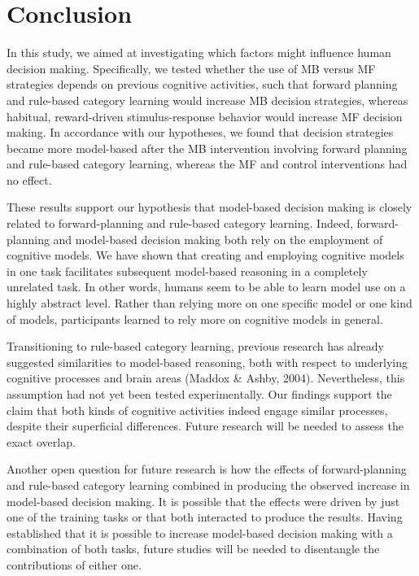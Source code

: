 \documentclass[11pt]{article} %
\begin{document}
\section{Conclusion}
In this study, we aimed at investigating which factors might influence human decision making. Specifically, we tested whether the use of MB versus MF strategies depends on previous cognitive activities, such that forward planning and rule-based category learning would increase MB decision strategies, whereas habitual, reward-driven stimulus-response behavior would increase MF decision making. In accordance with our hypotheses, we found that decision strategies became more model-based after the MB intervention involving forward planning and rule-based category learning, whereas the MF and control interventions had no effect.


These results support our hypothesis that model-based decision making is closely related to forward-planning and rule-based category learning. Indeed, forward-planning and model-based decision making both rely on the employment of cognitive models. We have shown that creating and employing cognitive models in one task facilitates subsequent model-based reasoning in a completely unrelated task. In other words, humans seem to be able to learn model use on a highly abstract level. Rather than relying more on one specific model or one kind of models, participants learned to rely more on cognitive models in general.

Transitioning to rule-based category learning, previous research has already suggested similarities to model-based reasoning, both with respect to underlying cognitive processes and brain areas (Maddox \& Ashby, 2004). Nevertheless, this assumption had not yet been tested experimentally. Our findings support the claim that both kinds of cognitive activities indeed engage similar processes, despite their superficial differences. Future research will be needed to assess the exact overlap. 

Another open question for future research is how the effects of forward-planning and rule-based category learning combined in producing the observed increase in model-based decision making. It is possible that the effects were driven by just one of the training tasks or that both interacted to produce the results. Having established that it is possible to increase model-based decision making with a combination of both tasks, future studies will be needed to disentangle the contributions of either one.
\end{document}
